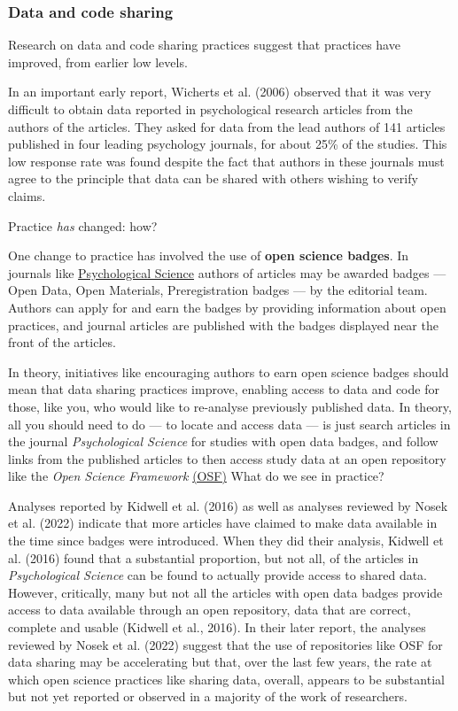 \documentclass[
  letterpaper,
  DIV=11,
  numbers=noendperiod]{scrreprt}
\begin{document}
\hypertarget{sec-sharing}{%
\subsubsection{Data and code sharing}\label{sec-sharing}}

Research on data and code sharing practices suggest that practices have
improved, from earlier low levels.

In an important early report, Wicherts et al. (2006) observed that it
was very difficult to obtain data reported in psychological research
articles from the authors of the articles. They asked for data from the
lead authors of 141 articles published in four leading psychology
journals, for about 25\% of the studies. This low response rate was
found despite the fact that authors in these journals must agree to the
principle that data can be shared with others wishing to verify claims.

Practice \emph{has} changed: how?

One change to practice has involved the use of \textbf{open science
badges}. In journals like
\href{https://www.psychologicalscience.org/publications/badges}{Psychological
Science} authors of articles may be awarded badges --- Open Data, Open
Materials, Preregistration badges --- by the editorial team. Authors can
apply for and earn the badges by providing information about open
practices, and journal articles are published with the badges displayed
near the front of the articles.

In theory, initiatives like encouraging authors to earn open science
badges should mean that data sharing practices improve, enabling access
to data and code for those, like you, who would like to re-analyse
previously published data. In theory, all you should need to do --- to
locate and access data --- is just search articles in the journal
\emph{Psychological Science} for studies with open data badges, and
follow links from the published articles to then access study data at an
open repository like the \emph{Open Science Framework}
\href{https://osf.io}{(OSF)} What do we see in practice?

Analyses reported by Kidwell et al. (2016) as well as analyses reviewed
by Nosek et al. (2022) indicate that more articles have claimed to make
data available in the time since badges were introduced. When they did
their analysis, Kidwell et al. (2016) found that a substantial
proportion, but not all, of the articles in \emph{Psychological Science}
can be found to actually provide access to shared data. However,
critically, many but not all the articles with open data badges provide
access to data available through an open repository, data that are
correct, complete and usable (Kidwell et al., 2016). In their later
report, the analyses reviewed by Nosek et al. (2022) suggest that the
use of repositories like OSF for data sharing may be accelerating but
that, over the last few years, the rate at which open science practices
like sharing data, overall, appears to be substantial but not yet
reported or observed in a majority of the work of researchers.
\end{document}
